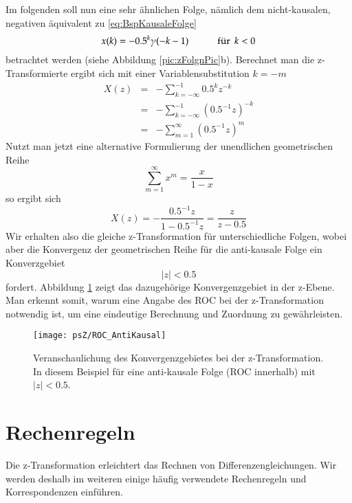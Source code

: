 \begin{example}
Im folgenden soll nun eine sehr ähnlichen Folge, nämlich
dem nicht-kausalen, negativen äquivalent zu \ref{eq:BspKausaleFolge}
\begin{equation}\nonumber
    x(k) = -0.5^k \gamma(-k-1) \qquad \fuer k < 0
\end{equation}
betrachtet werden (siehe Abbildung \ref{pic:zFolgnPic}b).
Berechnet man die z-Transformierte ergibt sich mit einer Variablensubstitution $k = -m$
\begin{eqnarray}\nonumber
    X(z) &=& - \sum_{k = -\infty}^{-1} 0.5^k z^{-k} \\
    & = &- \sum_{k = -\infty}^{-1} (0.5^{-1}z)^{-k} \\
    & = &- \sum_{m = 1}^{\infty} (0.5^{-1}z)^{m}
\end{eqnarray}
Nutzt man jetzt eine alternative Formulierung der unendlichen geometrischen
Reihe
\begin{equation}\nonumber
    \sum_{m = 1}^{\infty} x^m = \frac{x}{1-x}
\end{equation}
so ergibt sich
\begin{equation}\nonumber
    X(z) = - \frac{0.5^{-1}z}{1-0.5^{-1}z} = \frac{z}{z-0.5}
\end{equation}
Wir erhalten also die gleiche z-Transformation für unterschiedliche Folgen, wobei aber
die Konvergenz der geometrischen Reihe für die anti-kausale Folge ein Konverzgebiet
\begin{equation}\nonumber
    |z| < 0.5
\end{equation}
fordert. Abbildung \ref{pic:ROC_AntiKausal} zeigt das dazugehörige Konvergenzgebiet
in der z-Ebene.
Man erkennt somit, warum eine Angabe des ROC bei der z-Transformation notwendig ist, um eine
eindeutige Berechnung und Zuordnung zu gewährleisten.
\begin{figure}[H]
\begin{center}
\texttt{[image: psZ/ROC\_AntiKausal]}
\caption{\label{pic:ROC_AntiKausal} Veranschaulichung des Konvergenzgebietes
bei der z-Transformation. In diesem Beispiel für eine anti-kausale Folge (ROC innerhalb) mit
$|z| < 0.5$.}
\end{center}
\end{figure}
\hspace{0.1mm}
\end{example}

\section{Rechenregeln}
Die z-Transformation erleichtert das
Rechnen von Differenzengleichungen. Wir werden deshalb im weiteren
einige häufig verwendete Rechenregeln und Korrespondenzen
einführen.

